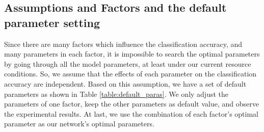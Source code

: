 \subsection{Assumptions and Factors and the default parameter setting}
Since there are many factors which influence the classification accuracy, and many parameters in each factor, it is impossible to search the optimal parameters by going through all the model parameters, at least under our current resource conditions. So, we assume that the effects of each parameter on the classification accuracy are independent. Based on this assumption, we have a set of default parameters as shown in Table \ref{table:default_paras}. We only adjust the parameters of one factor, keep the other parameters as default value, and observe the experimental results. At last, we use the combination of each factor's optimal parameter as our network's optimal parameters.
  \renewcommand\arraystretch{1.2}  
